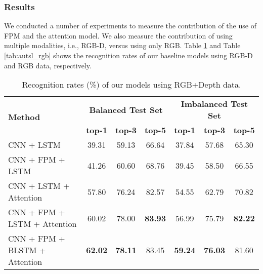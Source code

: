 \documentclass[11pt, a4paper, singlecolumn]{article}
\begin{document}
\subsubsection{Results}
\label{sec:results}

We conducted a number of experiments to measure the contribution of the use of FPM and the attention model. We also measure the contribution of using multiple modalities, i.e., RGB-D, versus using only RGB. Table \ref{tab:autsl_rgbd} and Table \ref{tab:autsl_rgb} shows the recognition rates of our baseline models using RGB-D and RGB data, respectively. 



\begin{table} 
	\caption{Recognition rates (\%) of our models using RGB+Depth data.}
	\centering
	\begin{tabular}{l|ccc|ccc}
		\hline
		\multirow{2}{*}{\textbf{Method}} &
		
		\multicolumn{3}{c}{\textbf{Balanced Test Set}} & \multicolumn{3}{c}{\textbf{Imbalanced Test Set}}                                                                                                                                                                       \\ 
		& {\textbf{top-1}} & {\textbf{top-3}} & {\textbf{top-5}} & {\textbf{top-1}} & {\textbf{top-3}} & {\textbf{top-5}} \\ \hline
		
		CNN + LSTM  & 39.31 & 59.13 & 66.64 & 37.84 & 57.68 & 65.30 \\
		CNN + FPM + LSTM & 41.26 & 60.60 & 68.76 & 39.45 & 58.50 & 66.55 \\ 
		CNN + LSTM + Attention  & 57.80 & 76.24 & 82.57 & 54.55 & 62.79 & 70.82 \\  \hline
		CNN + FPM + LSTM + Attention  & 60.02 & 78.00 & \textbf{83.93} & 56.99 & 75.79 & \textbf{82.22} \\ 
		CNN + FPM + BLSTM + Attention  & \textbf{62.02} & \textbf{78.11} & 83.45 & \textbf{59.24} & \textbf{76.03} & 81.60 \\ \hline		
		
	\end{tabular}
	\label{tab:autsl_rgbd}
\end{table}
\end{document}
